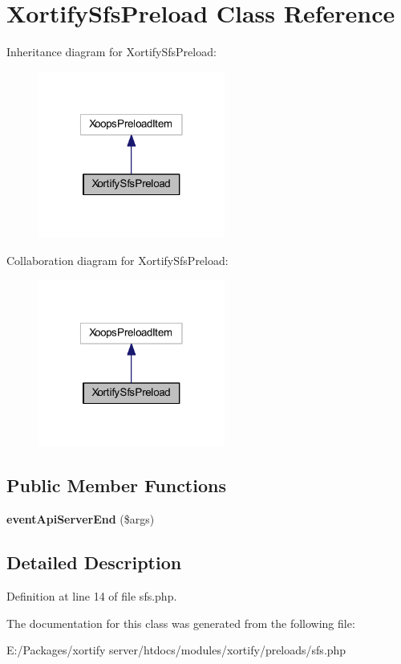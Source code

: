 \hypertarget{class_xortify_sfs_preload}{\section{Xortify\-Sfs\-Preload Class Reference}
\label{class_xortify_sfs_preload}
}


Inheritance diagram for Xortify\-Sfs\-Preload\-:
\nopagebreak
\begin{figure}[H]
\begin{center}
\leavevmode
\includegraphics[width=174pt]{class_xortify_sfs_preload__inherit__graph}
\end{center}
\end{figure}


Collaboration diagram for Xortify\-Sfs\-Preload\-:
\nopagebreak
\begin{figure}[H]
\begin{center}
\leavevmode
\includegraphics[width=174pt]{class_xortify_sfs_preload__coll__graph}
\end{center}
\end{figure}
\subsection*{Public Member Functions}
\begin{DoxyCompactItemize}
\item 
\hypertarget{class_xortify_sfs_preload_a62e459a2f1d1676b74b93eaa0e01bd02}{{\bfseries event\-Api\-Server\-End} (\$args)}\label{class_xortify_sfs_preload_a62e459a2f1d1676b74b93eaa0e01bd02}

\end{DoxyCompactItemize}


\subsection{Detailed Description}


Definition at line 14 of file sfs.\-php.



The documentation for this class was generated from the following file\-:\begin{DoxyCompactItemize}
\item 
E\-:/\-Packages/xortify server/htdocs/modules/xortify/preloads/sfs.\-php\end{DoxyCompactItemize}
